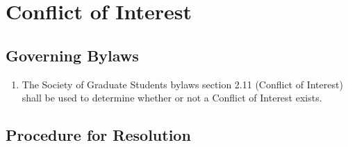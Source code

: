 \section{Conflict of Interest}\label{policy: coi}

\subsection{Governing Bylaws}
\begin{enumerate} [align=left]
\item The Society of Graduate Students bylaws section 2.11 (Conflict of Interest) shall be used to
determine whether or not a Conflict of Interest exists.
\end{enumerate}

\subsection{Procedure for Resolution}
